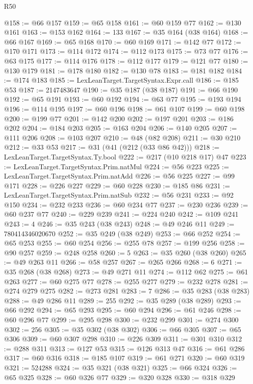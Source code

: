 \begin{lexlean}{R50}
\begin{coremodule}
@158 := @66 @157
@159 := @65 @158
@161 := @60 @159 @77
@162 := @130 @161
@163 := @153 @162
@164 := 133
@167 := @35 @164 (@38 @164)
@168 := @66 @167
@169 := @65 @168
@170 := @60 @169
@171 := @142 @77
@172 := @170 @171
@173 := @114 @172
@174 := @112 @173
@175 := @73 @77
@176 := @63 @175
@177 := @114 @176
@178 := @112 @177
@179 := @121 @77
@180 := @130 @179
@181 := @178 @180
@182 := @130 @78
@183 := @181 @182
@184 := @174 @183
@185 := LexLeanTarget.TargetSyntax.Expr.call
@186 := @185 @53
@187 := 2147483647
@190 := @35 @187 (@38 @187)
@191 := @66 @190
@192 := @65 @191
@193 := @60 @192
@194 := @63 @77
@195 := @193 @194
@196 := @114 @195
@197 := @60 @196
@198 := @61 @107
@199 := @60 @198
@200 := @199 @77
@201 := @142 @200
@202 := @197 @201
@203 := @186 @202
@204 := @184 @203
@205 := @163 @204
@206 := @140 @205
@207 := @111 @206
@208 := @103 @207
@210 := @48 (@82 @208)
@211 := @30 @210
@212 := @33 @53
@217 := @31 (@41 (@212 (@33 @86 @42)))
@218 := LexLeanTarget.TargetSyntax.Ty.bool
@222 := @217 (@10 @218 @17) @47
@223 := LexLeanTarget.TargetSyntax.Prim.natMul
@224 := @56 @223
@225 := LexLeanTarget.TargetSyntax.Prim.natAdd
@226 := @56 @225
@227 := @99 @171
@228 := @226 @227
@229 := @60 @228
@230 := @185 @86
@231 := LexLeanTarget.TargetSyntax.Prim.natSub
@232 := @56 @231
@233 := @92 @150
@234 := @232 @233
@236 := @60 @234 @77
@237 := @230 @236
@239 := @60 @237 @77
@240 := @229 @239
@241 := @224 @240
@242 := @109 @241
@243 := 4
@246 := @35 @243 (@38 @243)
@248 := @49 @246 @11
@249 := 780414346020670
@252 := @35 @249 (@38 @249)
@253 := @66 @252
@254 := @65 @253
@255 := @60 @254
@256 := @255 @78
@257 := @199 @256
@258 := @90 @257
@259 := @248 @258
@260 := 5
@263 := @35 @260 (@38 @260)
@265 := @49 @263 @11
@266 := @58 @257
@267 := @265 @266
@268 := 6
@271 := @35 @268 (@38 @268)
@273 := @49 @271 @11
@274 := @112 @62
@275 := @61 @263
@277 := @60 @275 @77
@278 := @255 @277
@279 := @232 @278
@281 := @274 @279 @275
@282 := @273 @281
@283 := 7
@286 := @35 @283 (@38 @283)
@288 := @49 @286 @11
@289 := 255
@292 := @35 @289 (@38 @289)
@293 := @66 @292
@294 := @65 @293
@295 := @60 @294
@296 := @61 @246
@298 := @60 @296 @77
@299 := @295 @298
@300 := @232 @299
@301 := @274 @300
@302 := 256
@305 := @35 @302 (@38 @302)
@306 := @66 @305
@307 := @65 @306
@309 := @60 @307 @298
@310 := @226 @309
@311 := @301 @310
@312 := @288 @311
@313 := @127 @53
@315 := @126 @313 @47
@316 := @61 @286
@317 := @60 @316
@318 := @185 @107
@319 := @61 @271
@320 := @60 @319
@321 := 524288
@324 := @35 @321 (@38 @321)
@325 := @66 @324
@326 := @65 @325
@328 := @60 @326 @77
@329 := @320 @328
@330 := @318 @329

\end{coremodule}
\end{lexlean}
